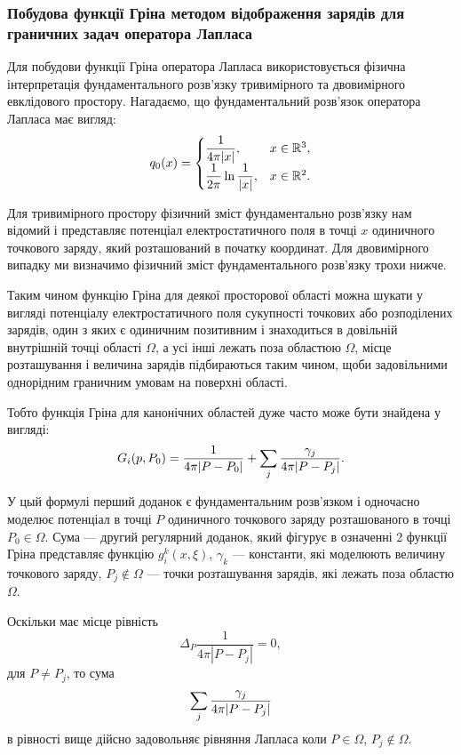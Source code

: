 \subsubsection{Побудова функції Гріна методом відображення зарядів для граничних задач оператора Лапласа}

Для побудови функції Гріна оператора Лапласа використовується фізична інтерпретація фундаментального розв'язку тривимірного та двовимірного евклідового простору. Нагадаємо, що фундаментальний розв'язок оператора Лапласа має вигляд:
\begin{equation}
	q_0(x) = \begin{cases}
		\dfrac{1}{4 \pi |x|}, & x \in \mathbb{R}^3, \\
		\dfrac{1}{2 \pi} \ln \dfrac{1}{|x|}, & x \in \mathbb{R}^2.
	\end{cases}
\end{equation}

Для тривимірного простору фізичний зміст фундаментально розв'язку нам відомий і представляє потенціал електростатичного поля в точці $x$ одиничного точкового заряду, який розташований в початку координат. Для двовимірного випадку ми визначимо фізичний зміст фундаментального розв'язку трохи нижче. \medskip

Таким чином функцію Гріна для деякої просторової області можна шукати у вигляді потенціалу електростатичного поля сукупності точкових або розподілених зарядів, один з яких є одиничним позитивним і знаходиться в довільній внутрішній точці області $\Omega$, а усі інші лежать поза областюю $\Omega$, місце розташування і величина зарядів підбираються таким чином, щоби задовільними однорідним граничним умовам на поверхні області. \medskip

Тобто функція Гріна для канонічних областей дуже часто може бути знайдена у вигляді:
\begin{equation}
	G_i(p, P_0) = \frac{1}{4 \pi |P - P_0|} + \displaystyle\sum\limits_j \frac{\gamma_j}{4 \pi |P - P_j|}.
\end{equation}

У цый формулі перший доданок є фундаментальним розв'язком і одночасно моделює потенціал в точці $P$ одиничного точкового заряду розташованого в точці $P_0 \in \Omega$. Сума --- другий регулярний доданок, який фігурує в означенні 2 функції Гріна представляє функцію  $g_i^k(x, \xi)$, $\gamma_k$ --- константи, які моделюють величину точкового заряду, $P_j \notin \Omega$ --- точки розташування зарядів, які лежать поза областю $\Omega$. \medskip

Оскільки має місце рівність
\begin{equation}
	\Delta_P \frac{1}{4 \pi |P - P_j|} = 0,
\end{equation}
для $P \ne P_j$, то сума
\begin{equation}
	\displaystyle\sum\limits_j \frac{\gamma_j}{4 \pi |P - P_j|}
\end{equation}
в рівності вище дійсно задовольняє рівняння Лапласа коли $P \in \Omega$, $P_j \notin \Omega$.

